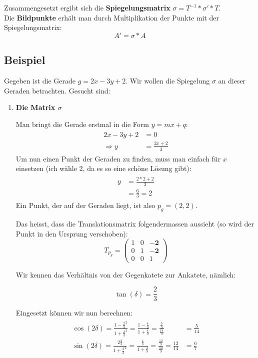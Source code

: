 Zusammengesetzt ergibt sich die \textbf{Spiegelungsmatrix} $\sigma = T^{-1}*\sigma'*T$.\\

Die \textbf{Bildpunkte} erhält man durch Multiplikation der Punkte mit der Spiegelungsmatrix:
\[
A' = \sigma * A
\]

\subsection{Beispiel}
Gegeben ist die Gerade $g = 2x - 3y + 2$. Wir wollen die Spiegelung $\sigma$ an dieser Geraden betrachten. Gesucht sind:

\begin{enumerate}
\item \textbf{Die Matrix $\sigma$}

Man bringt die Gerade erstmal in die Form $y = mx + q$:
\begin{align}
\begin{split}
2x - 3y + 2 &= 0\\
\Rightarrow y &= \frac{2x + 2}{3}
\end{split}
\end{align}
Um nun einen Punkt der Geraden zu finden, muss man einfach für $x$ einsetzen (ich wähle 2, da es so eine schöne Lösung gibt):
\begin{align}
\begin{split}
y &= \frac{2*2 + 2}{3}\\
&=  \frac{6}{3} = 2
\end{split}
\end{align}
Ein Punkt, der auf der Geraden liegt, ist also $p_g = (2,2)$.

Das heisst, dass die Translationsmatrix folgendermassen aussieht (so wird der Punkt in den Ursprung verschoben):
\[
T_{p_g} = \begin{pmatrix}
1 & 0 & \boldsymbol{-2}\\
0 & 1 & \boldsymbol{-2}\\
0 & 0 & 1
\end{pmatrix}
\]

Wir kennen das Verhältnis von der Gegenkatete zur Ankatete, nämlich: 

\[
\tan (\delta) = \frac{2}{3}
\]

Eingesetzt können wir nun berechnen:
\begin{align}
\begin{split}
\cos (2\delta) = \frac{1-\frac{2}{3}^2}{1+\frac{2}{3}^2} = \frac{1-\frac{4}{9}}{1+\frac{4}{9}} = \frac{\frac{5}{9}}{\frac{14}{9}} &= \frac{5}{14}\\
\sin (2\delta) = \frac{2\frac{2}{3}}{1+\frac{2}{3}^2} = \frac{\frac{4}{3}}{1+\frac{4}{9}} = \frac{\frac{12}{9}}{\frac{14}{9}} = \frac{12}{14} &= \frac{6}{7}\\
\end{split}
\end{align}


\end{enumerate}
